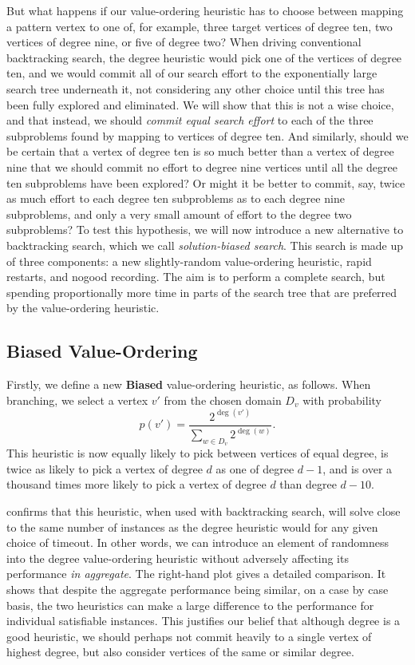 \documentclass[runningheads]{llncs}
\begin{document}
But what happens if our value-ordering heuristic has to choose between mapping a pattern vertex to
one of, for example, three target vertices of degree ten, two vertices of degree nine, or five of
degree two? When driving conventional backtracking search, the degree heuristic would pick one of
the vertices of degree ten, and we would commit all of our search effort to the exponentially large
search tree underneath it, not considering any other choice until this tree has been fully explored
and eliminated.  We will show that this is not a wise choice, and that instead, we should
\emph{commit equal search effort} to each of the three subproblems found by mapping to vertices of
degree ten.  And similarly, should we be certain that a vertex of degree ten is so much better than a
vertex of degree nine that we should commit no effort to degree nine vertices until all the degree
ten subproblems have been explored? Or might it be better to commit, say, twice as much effort to
each degree ten subproblems as to each degree nine subproblems, and only a very small amount of
effort to the degree two subproblems?  To test this hypothesis, we will now introduce a new
alternative to backtracking search, which we call \emph{solution-biased search}.  This search is
made up of three components: a new slightly-random value-ordering heuristic, rapid restarts, and
nogood recording. The aim is to perform a complete search, but spending proportionally more time in
parts of the search tree that are preferred by the value-ordering heuristic.

\subsection{Biased Value-Ordering}

Firstly, we define a new \textbf{Biased} value-ordering heuristic, as follows. When branching, we
select a vertex $v'$ from the chosen domain $D_v$ with probability \[ p(v') =
\frac{2^{\deg(v')}}{\sum_{w \in D_v}{2^{\deg(w)}}} \text{.} \] This heuristic is now equally likely
to pick between vertices of equal degree, is twice as likely to pick a vertex of degree $d$ as one
of degree $d - 1$, and is over a thousand times more likely to pick a vertex of degree $d$ than
degree $d - 10$.

 confirms that this heuristic, when used with backtracking
search, will solve close to the same number of instances as the degree heuristic would for any given
choice of timeout. In other words, we can introduce an element of randomness into the degree
value-ordering heuristic without adversely affecting its performance \emph{in aggregate}.  The
right-hand plot gives a detailed comparison. It shows that despite the aggregate performance being
similar, on a case by case basis, the two heuristics can make a large difference to the performance
for individual satisfiable instances. This justifies our belief that although degree is a good
heuristic, we should perhaps not commit heavily to a single vertex of highest degree, but also consider
vertices of the same or similar degree.
\end{document}

